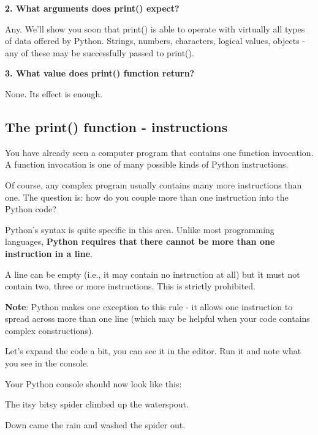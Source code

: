 \documentclass[a4paper,10pt]{article}
\begin{document}
\textbf{2. What arguments does {\selectfont print()} expect?}
\newline

Any. We'll show you soon that {\selectfont print()} is able to operate with virtually all types of data offered by Python. Strings, numbers, characters, logical values, objects - any of these may be successfully passed to {\selectfont print()}.
\newline

\textbf{3. What value does {\selectfont print()} function return?}
\newline

None. Its effect is enough.

\subsection{The print() function - instructions}
You have already seen a computer program that contains one function invocation. A function invocation is one of many possible kinds of Python instructions.
\newline

Of course, any complex program usually contains many more instructions than one. The question is: how do you couple more than one instruction into the Python code?
\newline

Python's syntax is quite specific in this area. Unlike most programming languages, \textbf{Python requires that there cannot be more than one instruction in a line}.
\newline

A line can be empty (i.e., it may contain no instruction at all) but it must not contain two, three or more instructions. This is strictly prohibited.
\newline

\textbf{Note}: Python makes one exception to this rule - it allows one instruction to spread across more than one line (which may be helpful when your code contains complex constructions).
\newline

Let's expand the code a bit, you can see it in the editor. Run it and note what you see in the console.
\newline

Your Python console should now look like this:
\newline

{\selectfont The itsy bitsy spider climbed up the waterspout.

Down came the rain and washed the spider out.}
\newline
\end{document}
